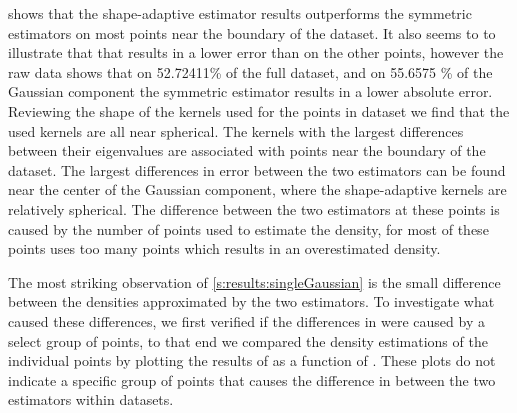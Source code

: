 		 shows that the shape-adaptive estimator results outperforms the symmetric estimators on most points near the boundary of the dataset. It also seems to to illustrate that that \mbe results in a lower error than \sambe on the other points, however the raw data shows that on \num{52.72411}\% of the full dataset, and on \num{55.6575} \% of the Gaussian component the symmetric estimator results in a lower absolute error.
		Reviewing the shape of the kernels used for the points in dataset \ferdosiOne we find that the used kernels are all near spherical. The kernels with the largest differences between their eigenvalues are associated with points near the boundary of the dataset. 
		The largest differences in error between the two estimators can be found near the center of the Gaussian component, where the shape-adaptive kernels are relatively spherical. The difference between the two estimators at these points is caused by the number of points used to estimate the density, for most of these points \sambe uses too many points which results in an overestimated density. 










\oldStuff

		The most striking observation of \cref{s:results:singleGaussian} is the small difference between the densities approximated by the two estimators. To investigate what caused these differences, we first verified if the differences in \mse were caused by a select group of points, to that end we compared the density estimations of the individual points by plotting the results of \sambe as a function of \mbe. These plots do not indicate a specific group of points that causes the difference in \MSE between the two estimators within datasets.
		
